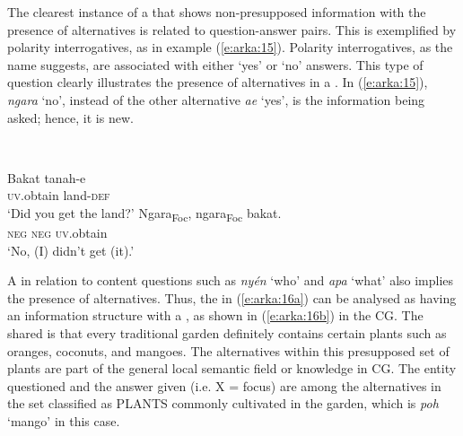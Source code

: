 \documentclass[output=paper
,modfonts
,nonflat]{langsci/langscibook}
\begin{document}
The clearest instance of a  that shows non-presupposed information with the presence of alternatives is related to question-answer pairs. This is exemplified by polarity interrogatives, as in example (\ref{e:arka:15}). Polarity interrogatives, as the name suggests, are associated with either ‘yes’ or ‘no’ answers. This type of question clearly illustrates the presence of alternatives in a . In (\ref{e:arka:15}), \textit{ngara} ‘no’, instead of the other alternative \textit{ae} ‘yes’, is the information being asked; hence, it is new.

\begin{exe}
	\label{e:arka:15}\\
	\begin{xlist}
		\label{e15q}
		\gll Bakat   tanah-e{\USQMark}\\
		\textsc{uv}.obtain   land-\textsc{def}\\
		\glt ‘Did you get the land?’
		\label{e:arka:15a}
		\gll {\ob}Ngara{\cb}\textsubscript{Foc},   {\ob}ngara{\cb}\textsubscript{Foc}   bakat.\\
		\phantom{[}\textsc{neg}  \phantom{[}\textsc{neg}   \textsc{uv}.obtain\\
		\glt ‘No, (I) didn't get (it).’
	\end{xlist}
\end{exe}

\noindent
A  in relation to content questions such as \textit{nyén} ‘who’ and \textit{apa} ‘what’ also implies the presence of alternatives. Thus, the  in (\ref{e:arka:16a}) can be analysed as having an information structure with a , as shown in (\ref{e:arka:16b}) in the CG. The shared  is that every traditional garden definitely contains certain plants such as oranges, coconuts, and mangoes. The alternatives within this presupposed set of plants are part of the general local semantic field or knowledge in CG. The entity questioned and the answer given (i.e. X = focus) are among the alternatives in the set classified as PLANTS commonly cultivated in the garden, which is \textit{poh} ‘mango’ in this case. 
\end{document}
